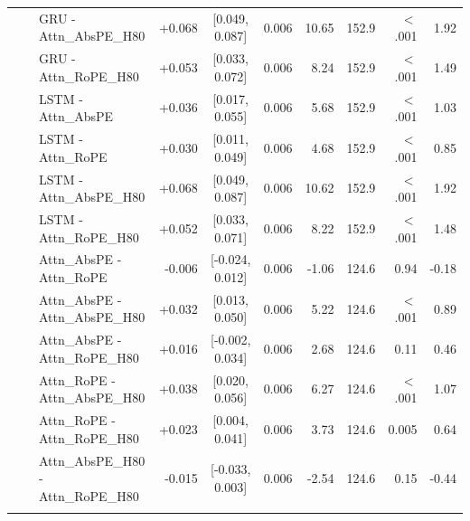 \begin{longtable}{@{}lllrcrrrrr@{}}
 &  & GRU - Attn\_AbsPE\_H80 & +0.068 & [0.049, 0.087] & 0.006 & 10.65 & 152.9 & $<$.001 & 1.92 \\
 &  & GRU - Attn\_RoPE\_H80 & +0.053 & [0.033, 0.072] & 0.006 & 8.24 & 152.9 & $<$.001 & 1.49 \\
 &  & LSTM - Attn\_AbsPE & +0.036 & [0.017, 0.055] & 0.006 & 5.68 & 152.9 & $<$.001 & 1.03 \\
 &  & LSTM - Attn\_RoPE & +0.030 & [0.011, 0.049] & 0.006 & 4.68 & 152.9 & $<$.001 & 0.85 \\
 &  & LSTM - Attn\_AbsPE\_H80 & +0.068 & [0.049, 0.087] & 0.006 & 10.62 & 152.9 & $<$.001 & 1.92 \\
 &  & LSTM - Attn\_RoPE\_H80 & +0.052 & [0.033, 0.071] & 0.006 & 8.22 & 152.9 & $<$.001 & 1.48 \\
 &  & Attn\_AbsPE - Attn\_RoPE & -0.006 & [-0.024, 0.012] & 0.006 & -1.06 & 124.6 & 0.94 & -0.18 \\
 &  & Attn\_AbsPE - Attn\_AbsPE\_H80 & +0.032 & [0.013, 0.050] & 0.006 & 5.22 & 124.6 & $<$.001 & 0.89 \\
 &  & Attn\_AbsPE - Attn\_RoPE\_H80 & +0.016 & [-0.002, 0.034] & 0.006 & 2.68 & 124.6 & 0.11 & 0.46 \\
 &  & Attn\_RoPE - Attn\_AbsPE\_H80 & +0.038 & [0.020, 0.056] & 0.006 & 6.27 & 124.6 & $<$.001 & 1.07 \\
 &  & Attn\_RoPE - Attn\_RoPE\_H80 & +0.023 & [0.004, 0.041] & 0.006 & 3.73 & 124.6 & 0.005 & 0.64 \\
 &  & Attn\_AbsPE\_H80 - Attn\_RoPE\_H80 & -0.015 & [-0.033, 0.003] & 0.006 & -2.54 & 124.6 & 0.15 & -0.44 \\
\addlinespace[2pt]
\end{longtable}
\normalsize
